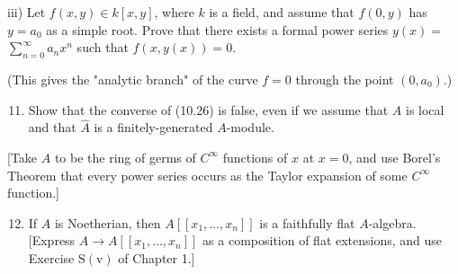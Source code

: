 \documentclass{standalone}
\theoremstyle{definition}
\theoremstyle{remark}
\begin{document}
iii) Let $f(x, y) \in k[x, y]$, where $k$ is a field, and assume that $f(0, y)$ has $y=a_{0}$ as a simple root. Prove that there exists a formal power series $y(x)=$ $\sum_{n=0}^{\infty} a_{n} x^{n}$ such that $f(x, y(x))=0$.

(This gives the "analytic branch" of the curve $f=0$ through the point $\left(0, a_{0}\right)$.)

\begin{enumerate}
  \setcounter{enumi}{10}
  \item Show that the converse of (10.26) is false, even if we assume that $A$ is local and that $\hat{A}$ is a finitely-generated $A$-module.
\end{enumerate}

[Take $A$ to be the ring of germs of $C^{\infty}$ functions of $x$ at $x=0$, and use Borel's Theorem that every power series occurs as the Taylor expansion of some $C^{\infty}$ function.]

\begin{enumerate}
  \setcounter{enumi}{11}
  \item If $A$ is Noetherian, then $A\left[\left[x_{1}, \ldots, x_{n}\right]\right]$ is a faithfully flat $A$-algebra. [Express $A \rightarrow A\left[\left[x_{1}, \ldots, x_{n}\right]\right]$ as a composition of flat extensions, and use Exercise $\mathrm{S}(\mathrm{v})$ of Chapter 1.]
\end{enumerate}
\end{document}

